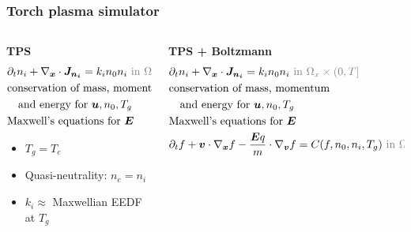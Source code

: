 \documentclass[mathserif, aspectratio=169]{beamer}
\newcommand{\vect}[1]{\boldsymbol{#1}}
\begin{document}
\begin{frame}
	\frametitle{Torch plasma simulator}
	\begin{columns}
		\begin{column}{0.48\textwidth}
			\textbf{TPS}
			\footnotesize
			\begin{align*}
				&\partial_t n_i + \nabla_{\vect{x}} \cdot \vect{J_{n_i}}  = k_i n_0 n_i  \color{gray}{\text{ in } \Omega_x \times (0,T]}\\
				&\text{conservation of mass, momentum} \\
				&\quad  \text{and energy for } \vect{u}, n_0, T_g \\
				&\text{Maxwell's equations for } \vect{E}
			\end{align*}
			\begin{itemize}
				\item $T_g=T_e$ %
				\item Quasi-neutrality: $n_e = n_i$ 
				\item $k_i \approx$ Maxwellian EEDF at $T_g$
			\end{itemize}
		\end{column}
		\begin{column}{0.48\textwidth}
			\textbf{TPS + Boltzmann}
			\footnotesize
			\begin{align*}
				&\partial_t n_i + \nabla_{\vect{x}} \cdot \vect{J_{n_i}}  = k_i n_0 n_i  \color{gray}{\text{ in } \Omega_x \times (0,T]}\\
				&\text{conservation of mass, momentum} \\
				&\quad  \text{and energy for } \vect{u}, n_0, T_g \\
				&\text{Maxwell's equations for } \vect{E}\\
				&\partial_t f  + \vect{v} \cdot \nabla_{\vect{x}} f -\frac{\vect{E} q}{m} \cdot \nabla_{\vect{v }}f = C(f, n_0, n_i, T_g) \color{gray}{\text{ in } \Omega_x \times \Omega_v \times (0,T]}

\end{align*}
\end{column}
\end{columns}
\end{frame}
\end{document}
